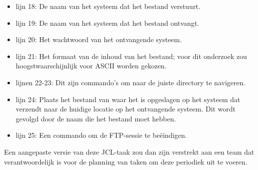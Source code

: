 \begin{itemize}
    \item lijn 18: De naam van het systeem dat het bestand verstuurt.
    \item lijn 19: De naam van het systeem dat het bestand ontvangt.
    \item lijn 20: Het wachtwoord van het ontvangende systeem.
    \item lijn 21: Het formaat van de inhoud van het bestand; voor dit onderzoek zou hoogstwaarschijnlijk voor ASCII worden gekozen.
    \item lijnen 22-23: Dit zijn commando's om naar de juiste directory te navigeren.
    \item lijn 24: Plaats het bestand van waar het is opgeslagen op het systeem dat verzendt naar de huidige locatie op het ontvangende systeem. Dit wordt gevolgd door de naam die het bestand moet hebben.
    \item lijn 25: Een commando om de FTP-sessie te beëindigen.
\end{itemize}

Een aangepaste versie van deze JCL-taak zou dan zijn verstrekt aan een team dat verantwoordelijk is voor de planning van taken om deze periodiek uit te voeren.
